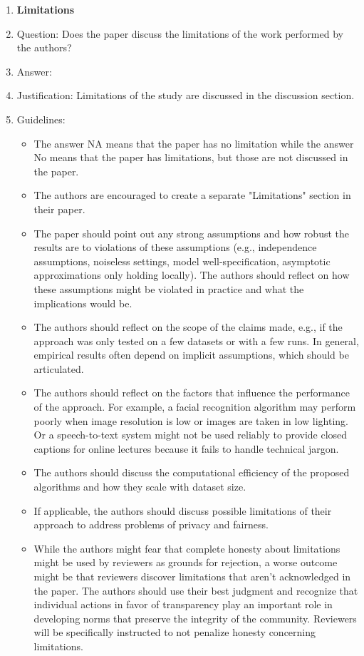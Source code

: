 \documentclass[letterpaper]{article}
\begin{document}
\begin{enumerate}
\item {\bf Limitations}
    \item[] Question: Does the paper discuss the limitations of the work performed by the authors?
    \item[] Answer: \answerYes{} %
    \item[] Justification: Limitations of the study are discussed in the discussion section.
    \item[] Guidelines:
    \begin{itemize}
        \item The answer NA means that the paper has no limitation while the answer No means that the paper has limitations, but those are not discussed in the paper. 
        \item The authors are encouraged to create a separate "Limitations" section in their paper.
        \item The paper should point out any strong assumptions and how robust the results are to violations of these assumptions (e.g., independence assumptions, noiseless settings, model well-specification, asymptotic approximations only holding locally). The authors should reflect on how these assumptions might be violated in practice and what the implications would be.
        \item The authors should reflect on the scope of the claims made, e.g., if the approach was only tested on a few datasets or with a few runs. In general, empirical results often depend on implicit assumptions, which should be articulated.
        \item The authors should reflect on the factors that influence the performance of the approach. For example, a facial recognition algorithm may perform poorly when image resolution is low or images are taken in low lighting. Or a speech-to-text system might not be used reliably to provide closed captions for online lectures because it fails to handle technical jargon.
        \item The authors should discuss the computational efficiency of the proposed algorithms and how they scale with dataset size.
        \item If applicable, the authors should discuss possible limitations of their approach to address problems of privacy and fairness.
        \item While the authors might fear that complete honesty about limitations might be used by reviewers as grounds for rejection, a worse outcome might be that reviewers discover limitations that aren't acknowledged in the paper. The authors should use their best judgment and recognize that individual actions in favor of transparency play an important role in developing norms that preserve the integrity of the community. Reviewers will be specifically instructed to not penalize honesty concerning limitations.
    \end{itemize}


\end{enumerate}
\end{document}
